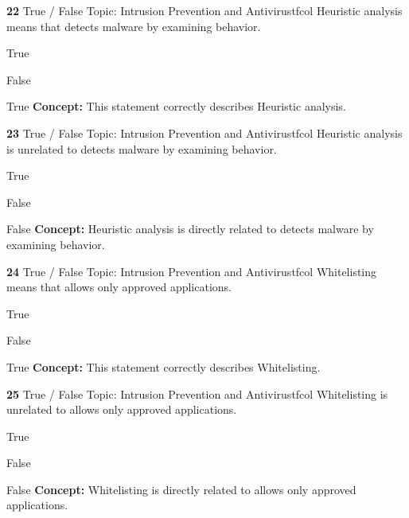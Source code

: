 \documentclass[10pt,a4paper]{article}
\begin{document}
\begin{qcard}{\color{white}\textbf{22} \hfill \small True / False \textbar{} Topic: Intrusion Prevention and Antivirus}{tfcol}
Heuristic analysis means that detects malware by examining behavior.

\begin{qoptions}
\item True
\item False
\end{qoptions}
\begin{explainbox}{True}
\textbf{Concept:} This statement correctly describes Heuristic analysis.
\end{explainbox}
\end{qcard}

\begin{qcard}{\color{white}\textbf{23} \hfill \small True / False \textbar{} Topic: Intrusion Prevention and Antivirus}{tfcol}
Heuristic analysis is unrelated to detects malware by examining behavior.

\begin{qoptions}
\item True
\item False
\end{qoptions}
\begin{explainbox}{False}
\textbf{Concept:} Heuristic analysis is directly related to detects malware by examining behavior.
\end{explainbox}
\end{qcard}

\begin{qcard}{\color{white}\textbf{24} \hfill \small True / False \textbar{} Topic: Intrusion Prevention and Antivirus}{tfcol}
Whitelisting means that allows only approved applications.

\begin{qoptions}
\item True
\item False
\end{qoptions}
\begin{explainbox}{True}
\textbf{Concept:} This statement correctly describes Whitelisting.
\end{explainbox}
\end{qcard}

\begin{qcard}{\color{white}\textbf{25} \hfill \small True / False \textbar{} Topic: Intrusion Prevention and Antivirus}{tfcol}
Whitelisting is unrelated to allows only approved applications.

\begin{qoptions}
\item True
\item False
\end{qoptions}
\begin{explainbox}{False}
\textbf{Concept:} Whitelisting is directly related to allows only approved applications.
\end{explainbox}
\end{qcard}
\end{document}
